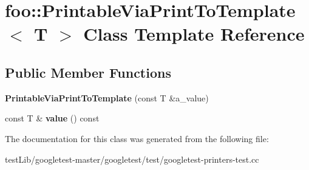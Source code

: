 \hypertarget{classfoo_1_1PrintableViaPrintToTemplate}{}\section{foo\+:\+:Printable\+Via\+Print\+To\+Template$<$ T $>$ Class Template Reference}
\label{classfoo_1_1PrintableViaPrintToTemplate}
\subsection*{Public Member Functions}
\begin{DoxyCompactItemize}
\item 
\mbox{\label{classfoo_1_1PrintableViaPrintToTemplate_a8fef9e8b59c9415624230b73469b517e}} 
{\bfseries Printable\+Via\+Print\+To\+Template} (const T \&a\+\_\+value)
\item 
\mbox{\label{classfoo_1_1PrintableViaPrintToTemplate_a14e0fcac9ae264e37e6212994b2920f6}} 
const T \& {\bfseries value} () const
\end{DoxyCompactItemize}


The documentation for this class was generated from the following file\+:\begin{DoxyCompactItemize}
\item 
test\+Lib/googletest-\/master/googletest/test/googletest-\/printers-\/test.\+cc\end{DoxyCompactItemize}

